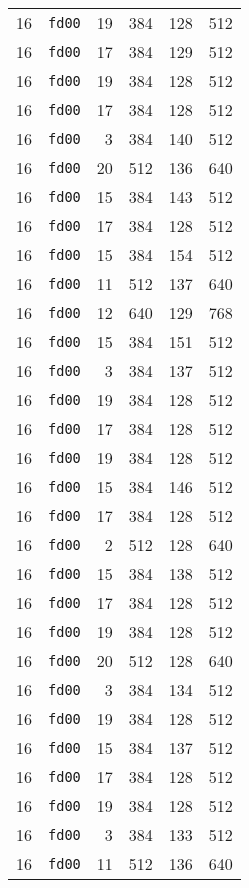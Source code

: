 \documentclass{article}
\begin{document}
\begin{table}[h!]
\begin{tabular}{llrrrl}
    16 & \texttt{fd00} & 19 & 384 & 128 & 512 \\
    16 & \texttt{fd00} & 17 & 384 & 129 & 512 \\
    16 & \texttt{fd00} & 19 & 384 & 128 & 512 \\
    16 & \texttt{fd00} & 17 & 384 & 128 & 512 \\
    16 & \texttt{fd00} & 3 & 384 & 140 & 512 \\
    16 & \texttt{fd00} & 20 & 512 & 136 & 640 \\
    16 & \texttt{fd00} & 15 & 384 & 143 & 512 \\
    16 & \texttt{fd00} & 17 & 384 & 128 & 512 \\
    16 & \texttt{fd00} & 15 & 384 & 154 & 512 \\
    16 & \texttt{fd00} & 11 & 512 & 137 & 640 \\
    16 & \texttt{fd00} & 12 & 640 & 129 & 768 \\
    16 & \texttt{fd00} & 15 & 384 & 151 & 512 \\
    16 & \texttt{fd00} & 3 & 384 & 137 & 512 \\
    16 & \texttt{fd00} & 19 & 384 & 128 & 512 \\
    16 & \texttt{fd00} & 17 & 384 & 128 & 512 \\
    16 & \texttt{fd00} & 19 & 384 & 128 & 512 \\
    16 & \texttt{fd00} & 15 & 384 & 146 & 512 \\
    16 & \texttt{fd00} & 17 & 384 & 128 & 512 \\
    16 & \texttt{fd00} & 2 & 512 & 128 & 640 \\
    16 & \texttt{fd00} & 15 & 384 & 138 & 512 \\
    16 & \texttt{fd00} & 17 & 384 & 128 & 512 \\
    16 & \texttt{fd00} & 19 & 384 & 128 & 512 \\
    16 & \texttt{fd00} & 20 & 512 & 128 & 640 \\
    16 & \texttt{fd00} & 3 & 384 & 134 & 512 \\
    16 & \texttt{fd00} & 19 & 384 & 128 & 512 \\
    16 & \texttt{fd00} & 15 & 384 & 137 & 512 \\
    16 & \texttt{fd00} & 17 & 384 & 128 & 512 \\
    16 & \texttt{fd00} & 19 & 384 & 128 & 512 \\
    16 & \texttt{fd00} & 3 & 384 & 133 & 512 \\
    16 & \texttt{fd00} & 11 & 512 & 136 & 640 \\

\end{tabular}
\end{table}
\end{document}

